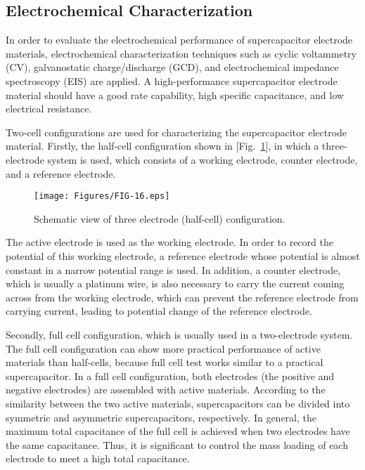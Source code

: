 \documentclass[reprint,amsmath,amssymb,aps,floatfix,
]{revtex4-2}
\begin{document}
\subsection{\label{sec:level3}Electrochemical Characterization}
In order to evaluate the electrochemical performance of supercapacitor electrode materials, electrochemical characterization techniques such as cyclic voltammetry (CV), galvanostatic charge/discharge (GCD), and electrochemical impedance spectroscopy (EIS) are applied. A high-performance supercapacitor electrode material should have a good rate capability, high specific capacitance, and low electrical resistance.

Two-cell configurations are used for characterizing the supercapacitor electrode material. Firstly, the half-cell configuration shown in [Fig.~\ref{fig:fig16}], in which a three-electrode system is used, which consists of a working electrode, counter electrode, and a reference electrode.
\begin{figure}[t]
    \centering
    \texttt{[image: Figures/FIG-16.eps]}
    \caption{\label{fig:fig16}Schematic view of three electrode (half-cell) configuration.}
    \end{figure}
The active electrode is used as the working electrode. In order to record the potential of this working electrode, a reference electrode whose potential is almost constant in a narrow potential range is used. In addition, a counter electrode, which is usually a platinum wire, is also necessary to carry the current coming across from the working electrode, which can prevent the reference electrode from carrying current, leading to potential change of the reference electrode.

Secondly, full cell configuration, which is usually used in a two-electrode system. The full cell configuration can show more practical performance of active materials than half-cells, because full cell test works similar to a practical supercapacitor. In a full cell configuration, both electrodes (the positive and negative electrodes) are assembled with active materials. According to the similarity between the two active materials, supercapacitors can be divided into symmetric and asymmetric supercapacitors, respectively. In general, the maximum total capacitance of the full cell is achieved when two electrodes have the same capacitance. Thus, it is significant to control the mass loading of each electrode to meet a high total capacitance.
\end{document}
